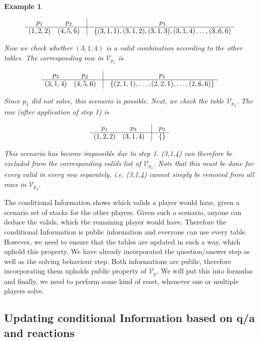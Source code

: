 \documentclass{article}
\newtheorem{example}{Example}[section]
\begin{document}
\begin{example}
\begin{enumerate}
\[
\begin{array}{cccc}
p_1 & p_2 & \vline & p_3 \\ \hline
(1,2,2) & (4,5,6) & \vline & \{(3,1,1), (3,1,2), (3,1,3), (3,1,4) \ldots,  (3,6,6) \\
\end{array}
\]

Now we check whether $(3,1,4)$ is a valid combination according to the other tables. The corresponding row in $\mathcal{V}_{p_1}$ is

\[
\begin{array}{cccc}
p_3 & p_2 & \vline & p_1 \\ \hline
(3,1,4) & (4,5,6) & \vline & \{ (2,1,1), \ldots, (2,2,1), \ldots, (2,6,6) \}
\end{array}
\]

Since $p_1$ did not solve, this scenario is possible. Next, we check the table $\mathcal{V}_{p_2}$. The row (after application of step 1) is

\[
\begin{array}{cccc}
p_1 & p_3 & \vline & p_2 \\ \hline
(1,2,2) & (3,1,4) & \vline & \{ \}
\end{array}
\]

This scenario has become impossible due to step 1. (3,1,4) can therefore be excluded from the corresponding valids list of $\mathcal{V}_{p_3}$. Note that this must be done for every valid in every row separately, i.e. (3,1,4) cannot simply be removed from all rows in $\mathcal{V}_{p_3}$.
 
\end{enumerate}

\end{example}

The conditional Information shows which valids a player would have, given a scenario set of stacks for the other players. Given such a scenario, anyone can deduce the valids, which the remaining player would have. Therefore the conditional Information is public information and everyone can use every table. However, we need to ensure that the tables are updated in such a way, which uphold this property. We have already incorporated the question/answer step as well as the solving behaviour step. Both informations are public, therefore incorporating them upholds public property of $\mathcal{V}_p$. We will put this into formulas and finally, we need to perform some kind of reset, whenever one or multiple players solve. 

\subsection{Updating conditional Information based on q/a and reactions}
\end{document}
